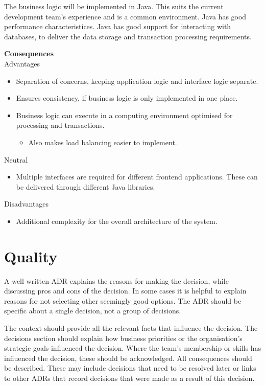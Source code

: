 The business logic will be implemented in Java.
This suits the current development team's experience and is a common environment.
Java has good performance characteristices.
Java has good support for interacting with databases, to deliver the data storage and transaction processing requirements.

\filbreak
\noindent\textbf{Consequences}\\
Advantages
\begin{itemize}[noitemsep,nolistsep]
    \item Separation of concerns, keeping application logic and interface logic separate.
    \item Ensures consistency, if business logic is only implemented in one place.
    \item Business logic can execute in a computing environment optimised for processing and transactions.
    \begin{itemize}[noitemsep,nolistsep]
        \item Also makes load balancing easier to implement.
    \end{itemize}
\end{itemize}
Neutral
\begin{itemize}[noitemsep,nolistsep]
    \item Multiple interfaces are required for different frontend applications.
             These can be delivered through different Java libraries.
\end{itemize}
Disadvantages
\begin{itemize}[noitemsep,nolistsep]
    \item Additional complexity for the overall architecture of the system.
\end{itemize}

\section{Quality}
A well written ADR explains the reasons for making the decision, while discussing pros and cons of the decision.
In some cases it is helpful to explain reasons for not selecting other seemingly good options.
The ADR should be specific about a single decision, not a group of decisions.

The context should provide all the relevant facts that influence the decision.
The decisions section should explain how business priorities or the organisation's strategic goals influenced the decision.
Where the team's membership or skills has influenced the decision, these should be acknowledged.
All consequences should be described.
These may include decisions that need to be resolved later or
links to other ADRs that record decisions that were made as a result of this decision.

